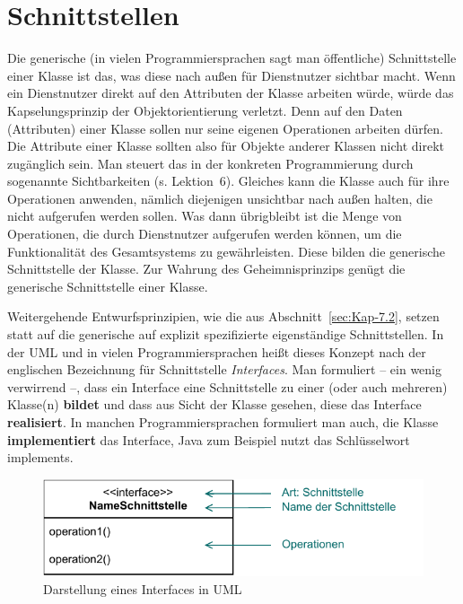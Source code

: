 \section{Schnittstellen}
\label{sec:Kap-8.6}

Die generische (in vielen Programmiersprachen sagt man öffentliche) Schnittstelle einer Klasse ist das, was diese nach außen für Dienstnutzer sichtbar macht. Wenn ein Dienstnutzer direkt auf den Attributen der Klasse arbeiten würde, würde das Kapselungsprinzip der Objektorientierung verletzt. Denn auf den Daten (Attributen) einer Klasse sollen nur seine eigenen Operationen arbeiten dürfen. Die Attribute einer Klasse sollten also für Objekte anderer Klassen nicht direkt zugänglich sein. Man steuert das in der konkreten Programmierung durch sogenannte Sichtbarkeiten (s. Lektion~6). Gleiches kann die Klasse auch für ihre Operationen anwenden, nämlich diejenigen unsichtbar nach außen halten, die nicht aufgerufen werden sollen. Was dann übrigbleibt ist die Menge von Operationen, die durch Dienstnutzer aufgerufen werden können, um die Funktionalität des Gesamtsystems zu gewährleisten. Diese bilden die generische Schnittstelle der Klasse. Zur Wahrung des Geheimnisprinzips genügt die generische Schnittstelle einer Klasse.

Weitergehende Entwurfsprinzipien, wie die aus Abschnitt~\ref{sec:Kap-7.2}, setzen statt auf die generische auf explizit spezifizierte eigenständige Schnittstellen. In der UML und in vielen Programmiersprachen heißt dieses Konzept nach der englischen Bezeichnung für Schnittstelle \textit{Interfaces}. Man formuliert -- ein wenig verwirrend --, dass ein Interface eine Schnittstelle zu einer (oder auch mehreren) Klasse(n) \textbf{bildet} und dass aus Sicht der Klasse gesehen, diese das Interface \textbf{realisiert}. In manchen Programmiersprachen formuliert man auch, die Klasse \textbf{implementiert} das Interface, Java zum Beispiel nutzt das Schlüsselwort implements.

\vspace{\baselineskip} %

\begin{figure}[h!]
	\centering
	\includegraphics[scale=1.0]{Bilder/Kapitel-8/schnittstelle_in_uml.pdf}
	\caption{Darstellung eines Interfaces in UML}
	\label{fig:schnittstelle_in_uml}
\end{figure}

